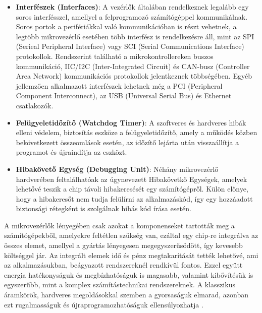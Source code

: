\begin{itemize}
	\item \textbf{Interfészek (Interfaces)}: A vezérlők általában rendelkeznek legalább egy soros interfésszel, amellyel a felprogramozó számítógéppel kommunikálnak. Soros portok a perifériákkal való kommunikációban is részt vehetnek, a legtöbb mikrovezérlő esetében több interfész is rendelkezésre áll, mint az SPI (Serieal Peripheral Interface) vagy SCI (Serial Communications Interface) protokollok. Rendszerint található a mikrokontrollereken buszos kommunikáció, IIC/I2C (Inter-Integrated Circuit) és CAN-busz (Controller Area Network) kommunikációs protokollok jelentkeznek többségében. Egyéb jellemzően alkalmazott interfészek lehetnek még a PCI (Peripheral Component Interconnect), az USB (Universal Serial Bus) és Ethernet csatlakozók.
	\item \textbf{Felügyeletidőzítő (Watchdog Timer)}: A szoftveres és hardveres hibák elleni védelem, biztosítás eszköze a felügyeletidőzítő, amely a működés közben bekövetkezett összeomlások esetén, az időzítő lejárta után visszaállítja a programot és újraindítja az eszközt.
	\item \textbf{Hibakövető Egység (Debugging Unit)}: Néhány mikrovezérlő hardverében feltalálhatóak az úgynevezett Hibakövetkő Egységek, amelyek lehetővé teszik a chip távoli hibakeresését egy számítógépről. Külön előnye, hogy a hibakeresőt nem tudja felülírni az alkalmazáskód, így egy hozzáadott biztonsági rétegként is szolgálnak hibás kód írása esetén.
\end{itemize}
A mikrovezérlők lényegében csak azokat a komponenseket tartották meg a számítógépekből, amelyekre feltétlen szükség van, ezáltal egy chip-re integrálva az összes elemet, amellyel a gyártás lényegesen megegyszerűsödött, így kevesebb költséggel jár. Az integrált elemek idő és pénz megtakarítását tették lehetővé, ami az alkalmazásukban, beágyazott rendszereknél rendkívül fontos. Ezzel együtt energia hatékonyságuk és megbízhatóságuk is magasabb, valamint kibővítésük is egyszerűbb, mint a komplex számítástechnikai rendszereknek. A klasszikus áramkörök, hardveres megoldásokkal szemben a gyorsaságuk elmarad, azonban ezt rugalmasságuk és újraprogramozhatóságuk ellensúlyozhatja \cite{Gridling2007}.